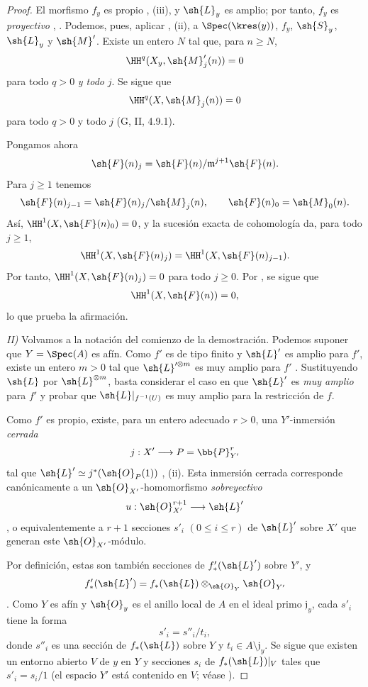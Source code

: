 \documentclass[oneside]{amsart}
\renewcommand{\leq}{\leqslant}
\renewcommand{\geq}{\geqslant}
\newcommand{\oldpage}[2][]{{\marginnote{\normalfont\textbf{#1}~|~#2}}\ignorespaces}
\begin{document}
\begin{proof}
El morfismo $f_y$ es propio , (iii), y
$\sh{L}_y$ es amplio; por tanto, $f_y$ es \emph{proyectivo}
, . Podemos, pues, aplicar
, (ii), a
$\Spec(\kres(y))$, $f_y$, $\sh{S}_y$, $\sh{L}_y$ y $\sh{M}'$.
Existe un entero $N$ tal que, para $n\geq N$,
\[
  \HH^q(X_y,\sh{M}'_j(n))=0
\]
para todo $q>0$ \emph{y todo} $j$. Se sigue que
\[
  \HH^q(X,\sh{M}_j(n))=0
\]
para todo $q>0$ y todo $j$ (G, II, 4.9.1).

Pongamos ahora
\[
  \sh{F}(n)_j
  =
  \sh{F}(n)/\mathfrak m^{j+1}\sh{F}(n).
\]
Para $j\geq1$ tenemos
\[
  \sh{F}(n)_{j-1}
  =
  \sh{F}(n)_j/\sh{M}_j(n),
  \qquad
  \sh{F}(n)_0=\sh{M}_0(n).
\]
Así, $\HH^1(X,\sh{F}(n)_0)=0$, y la sucesión exacta de cohomología
da, para todo $j\geq1$,
\[
  \HH^1(X,\sh{F}(n)_j)
  =
  \HH^1(X,\sh{F}(n)_{j-1}).
\]
Por tanto, $\HH^1(X,\sh{F}(n)_j)=0$ para todo $j\geq0$. Por
, se sigue que
\[
  \HH^1(X,\sh{F}(n))=0,
\]
lo que prueba la afirmación.

\oldpage[III]{146}

\noindent\textit{II)} Volvamos a la notación del comienzo de
la demostración. Podemos suponer que $Y=\Spec(A)$ es afín. Como
$f'$ es de tipo finito y $\sh{L}'$ es amplio para $f'$, existe un
entero $m>0$ tal que $\sh{L}'^{\otimes m}$ es muy amplio para
$f'$ . Sustituyendo $\sh{L}$ por
$\sh{L}^{\otimes m}$, basta considerar el caso en que
$\sh{L}'$ es \emph{muy amplio} para $f'$ y probar que
$\sh{L}|_{f^{-1}(U)}$ es muy amplio para la restricción de $f$.

Como $f'$ es propio, existe, para un entero adecuado $r>0$, una
$Y'$-inmersión \emph{cerrada}
\[
  j:X'\longrightarrow P=\bb{P}_{Y'}^r
\]
tal que $\sh{L}'\simeq j^*(\sh{O}_P(1))$
, (ii). Esta inmersión cerrada corresponde
canónicamente a un $\sh{O}_{X'}$-homomorfismo \emph{sobreyectivo}
\[
  u:\sh{O}_{X'}^{r+1}\longrightarrow\sh{L}'
\]
, o equivalentemente  a
$r+1$ secciones $s'_i$ $(0\leq i\leq r)$ de $\sh{L}'$ sobre $X'$
que generan este $\sh{O}_{X'}$-módulo.

Por definición, estas son también secciones de $f'_*(\sh{L}')$ sobre
$Y'$, y
\[
  f'_*(\sh{L}')
  =
  f_*(\sh{L})\otimes_{\sh{O}_Y}\sh{O}_{Y'}
\]
. Como $Y$ es afín y $\sh{O}_y$ es el
anillo local de $A$ en el ideal primo $\mathfrak j_y$, cada $s'_i$
tiene la forma
\[
  s'_i=s''_i/t_i,
\]
donde $s''_i$ es una sección de $f_*(\sh{L})$ sobre $Y$ y
$t_i\in A\setminus\mathfrak j_y$. Se sigue que existen un
entorno abierto $V$ de $y$ en $Y$ y secciones $s_i$ de
$f_*(\sh{L})|_V$ tales que $s'_i=s_i/1$ (el espacio $Y'$ está
contenido en $V$; véase ).


\end{proof}
\end{document}
